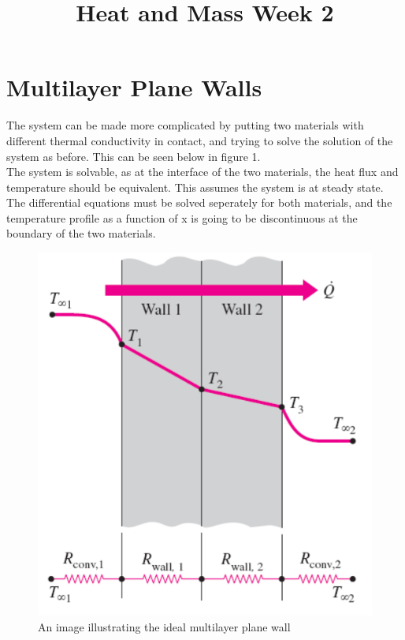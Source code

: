\documentclass[•]{article}
\begin{document}
\title{Heat and Mass Week 2}
\maketitle
\section*{Multilayer Plane Walls}
The system can be made more complicated by putting two materials with different thermal conductivity in contact, and trying to solve the solution of the system as before. This can be seen below in figure 1.\\

The system is solvable, as at the interface of the two materials, the heat flux and temperature should be equivalent. This assumes the system is at steady state. The differential equations must be solved seperately for both materials, and the temperature profile as a function of x is going to be discontinuous at the boundary of the two materials.

\begin{figure}[H]
\begin{center}
\includegraphics[scale=0.4]{TwoWall.png}
\end{center}
\caption{An image illustrating the ideal multilayer plane wall}
\end{figure}
\end{document}
